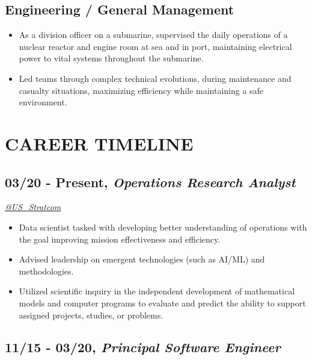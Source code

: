 \documentclass[10pt]{article}
\def\tightlist{}
\begin{document}
\hypertarget{engineering-general-management}{%
\subsection{Engineering / General
Management}\label{engineering-general-management}}

\begin{itemize}
\tightlist
\item
  As a division officer on a submarine, supervised the daily operations
  of a nuclear reactor and engine room at sea and in port, maintaining
  electrical power to vital systems throughout the submarine.
\item
  Led teams through complex technical evolutions, during maintenance and
  casualty situations, maximizing efficiency while maintaining a safe
  environment.
\end{itemize}

\hypertarget{career-timeline}{%
\section{CAREER TIMELINE}\label{career-timeline}}

\hypertarget{present-operations-research-analyst}{%
\subsection{\texorpdfstring{03/20 - Present, \textbf{\emph{Operations
Research
Analyst}}}{03/20 - Present, Operations Research Analyst}}\label{present-operations-research-analyst}}

\emph{\href{https://twitter.com/US_Stratcom}{@US\_Stratcom}}

\begin{itemize}
\tightlist
\item
  Data scientist tasked with developing better understanding of
  operations with the goal improving mission effectiveness and
  efficiency.
\item
  Advised leadership on emergent technologies (such as AI/ML) and
  methodologies.
\item
  Utilized scientific inquiry in the independent development of
  mathematical models and computer programs to evaluate and predict the
  ability to support assigned projects, studies, or problems.
\end{itemize}

\hypertarget{principal-software-engineer}{%
\subsection{\texorpdfstring{11/15 - 03/20, \textbf{\emph{Principal
Software
Engineer}}}{11/15 - 03/20, Principal Software Engineer}}\label{principal-software-engineer}}
\end{document}
